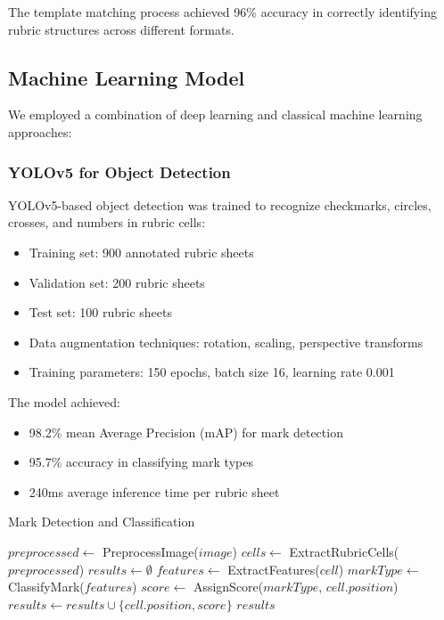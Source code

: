 \documentclass[12pt]{article}
\begin{document}
The template matching process achieved 96\% accuracy in correctly identifying rubric structures across different formats.

\subsection{Machine Learning Model}
We employed a combination of deep learning and classical machine learning approaches:

\subsubsection{YOLOv5 for Object Detection}
YOLOv5-based object detection was trained to recognize checkmarks, circles, crosses, and numbers in rubric cells:
\begin{itemize}
    \item Training set: 900 annotated rubric sheets
    \item Validation set: 200 rubric sheets
    \item Test set: 100 rubric sheets
    \item Data augmentation techniques: rotation, scaling, perspective transforms
    \item Training parameters: 150 epochs, batch size 16, learning rate 0.001
\end{itemize}

The model achieved:
\begin{itemize}
    \item 98.2\% mean Average Precision (mAP) for mark detection
    \item 95.7\% accuracy in classifying mark types
    \item 240ms average inference time per rubric sheet
\end{itemize}

\begin{algorithm}
\caption{Mark Detection and Classification}
\begin{algorithmic}[1]
    \State $preprocessed \gets$ PreprocessImage($image$)
    \State $cells \gets$ ExtractRubricCells($preprocessed$)
    \State $results \gets \emptyset$
        \State $features \gets$ ExtractFeatures($cell$)
        \State $markType \gets$ ClassifyMark($features$)
        \State $score \gets$ AssignScore($markType$, $cell.position$)
        \State $results \gets results \cup \{cell.position, score\}$
    \EndFor
    \State \Return $results$
\EndProcedure
\end{algorithmic}
\end{algorithm}
\end{document}

